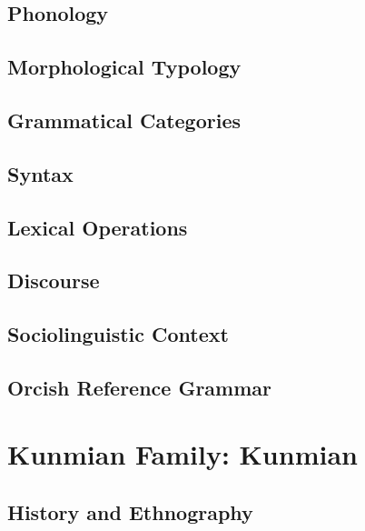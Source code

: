 \documentclass[12pt,letterpaper,openany,twoside]{memoir}
\let\originalpart=\part
\def\part{\cleardoublepage\originalpart}
\begin{document}
\chapter{Phonology}

\chapter{Morphological Typology}

\chapter{Grammatical Categories}

\chapter{Syntax}

\chapter{Lexical Operations}

\chapter{Discourse}

\chapter{Sociolinguistic Context}

\chapter{Orcish Reference Grammar}

\part{Kunmian Family: Kunmian}

\chapter{History and Ethnography}
\end{document}
